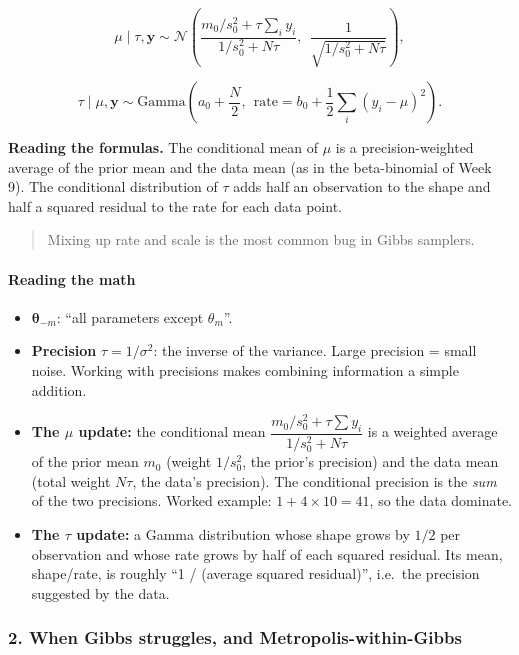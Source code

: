 \[
\mu \mid \tau, \mathbf{y} \sim \mathcal{N}\!\left(\frac{m_0/s_0^2 + \tau \sum_i y_i}{1/s_0^2 + N\tau},\ \ \frac{1}{\sqrt{1/s_0^2 + N\tau}}\right),
\]

\[
\tau \mid \mu, \mathbf{y} \sim \mathrm{Gamma}\!\left(a_0 + \frac{N}{2},\ \ \text{rate} = b_0 + \frac12\sum_i (y_i - \mu)^2\right).
\]

\textbf{Reading the formulas.} The conditional mean of \(\mu\) is a
precision-weighted average of the prior mean and the data mean (as in
the beta-binomial of Week 9). The conditional distribution of \(\tau\)
adds half an observation to the shape and half a squared residual to the
rate for each data point.

\begin{quote}
Mixing up rate and scale is the most common bug in Gibbs samplers.
\end{quote}

\paragraph{Reading the math}

\begin{itemize}
\tightlist
\item
  \(\boldsymbol\theta_{-m}\): ``all parameters except \(\theta_m\)''.
\item
  \textbf{Precision} \(\tau = 1/\sigma^2\): the inverse of the variance.
  Large precision = small noise. Working with precisions makes combining
  information a simple addition.
\item
  \textbf{The \(\mu\) update:} the conditional mean
  \(\dfrac{m_0/s_0^2 + \tau\sum y_i}{1/s_0^2 + N\tau}\) is a weighted
  average of the prior mean \(m_0\) (weight \(1/s_0^2\), the prior's
  precision) and the data mean (total weight \(N\tau\), the data's
  precision). The conditional precision is the \emph{sum} of the two
  precisions. Worked example: \(1 + 4\times10 = 41\), so the data
  dominate.
\item
  \textbf{The \(\tau\) update:} a Gamma distribution whose shape grows
  by \(1/2\) per observation and whose rate grows by half of each
  squared residual. Its mean, shape/rate, is roughly ``1 / (average
  squared residual)'', i.e.~the precision suggested by the data.
\end{itemize}

\subsubsection{2. When Gibbs struggles, and Metropolis-within-Gibbs}

